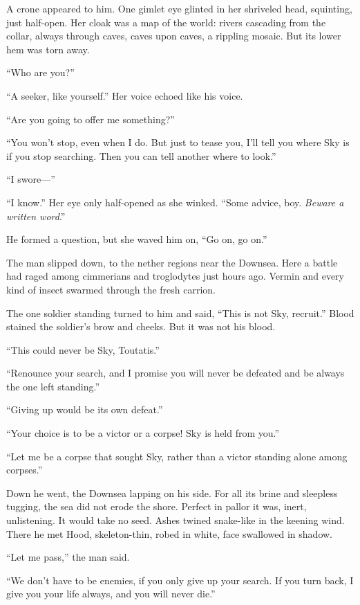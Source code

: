 A crone appeared to him. One gimlet eye glinted in her shriveled head,
squinting, just half-open. Her cloak was a map of the world: rivers
cascading from the collar, always through caves, caves upon caves, a
rippling mosaic. But its lower hem was torn away.

``Who are you?''

``A seeker, like yourself.'' Her voice echoed like his voice.

``Are you going to offer me something?''

``You won't stop, even when I do. But just to tease you, I'll tell you
where Sky is if you stop searching. Then you can tell another where to
look.''

``I swore---''

``I know.'' Her eye only half-opened as she winked. ``Some advice, boy.
\emph{Beware a written word}.''

He formed a question, but she waved him on, ``Go on, go on.''

The man slipped down, to the nether regions near the Downsea. Here a
battle had raged among cimmerians and troglodytes just hours ago. Vermin
and every kind of insect swarmed through the fresh carrion.

The one soldier standing turned to him and said, ``This is not Sky,
recruit.'' Blood stained the soldier's brow and cheeks. But it was not
his blood.

``This could never be Sky, Toutatis.''

``Renounce your search, and I promise you will never be defeated and be
always the one left standing.''

``Giving up would be its own defeat.''

``Your choice is to be a victor or a corpse! Sky is held from you.''

``Let me be a corpse that sought Sky, rather than a victor standing
alone among corpses.''

Down he went, the Downsea lapping on his side. For all its brine and
sleepless tugging, the sea did not erode the shore. Perfect in pallor it
was, inert, unlistening. It would take no seed. Ashes twined snake-like
in the keening wind. There he met Hood, skeleton-thin, robed in white,
face swallowed in shadow.

``Let me pass,'' the man said.

``We don't have to be enemies, if you only give up your search. If you
turn back, I give you your life always, and you will never die.''

